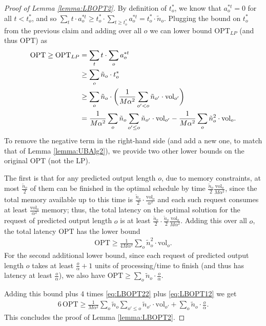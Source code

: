 \documentclass[11pt, a4paper]{article}
\theoremstyle{plain}
\theoremstyle{definition}
\theoremstyle{remark}
\newcommand{\OPT}{\text{OPT}}
\newcommand{\vol}{\textrm{vol}}
\begin{document}
\begin{proof}[Proof of Lemma \ref{lemma:LBOPT2}]
	By definition of $t^*_o$, we know that $a^{*t}_o = 0$ for all $t < t^*_o$, and so $\sum_t t \cdot a^{*t}_o \ge t^*_o \cdot \sum_{t \ge t^*_o} a^{*t}_o = t^*_o \cdot \tilde{n}_o$. Plugging the bound on $t^*_o$ from the previous claim and adding over all $o$ we can lower bound $\OPT_{LP}$ (and thus $\OPT$) as
	\begin{align}
	\OPT \ge \OPT_{LP} &= \sum_t t \cdot \sum_o a^{*t}_o \notag\\
	&\ge \sum_o \tilde{n}_o \cdot t^*_o \notag\\
	&\ge \sum_o \tilde{n}_o \cdot \bigg( \frac{1}{M\alpha^2} \sum_{o' < o} \tilde{n}_{o'} \cdot \vol_{o'} \bigg) \notag\\
	&=  \frac{1}{M\alpha^2} \sum_o \tilde{n}_o \sum_{o' \le o} \tilde{n}_{o'} \cdot \vol_{o'} - \frac{1}{M\alpha^2} \sum_o \tilde{n}_o^2 \cdot \vol_o.\label{eq:LBOPT12}
	\end{align}
	To remove the negative term in the right-hand side (and add a new one, to match that of Lemma \ref{lemma:UBAlg2}), we provide two other lower bounds on the original $\OPT$ (not the LP). 
	
	The first is that for any predicted output length $o$, due to memory constraints, at most $\frac{\tilde{n}_o}{2}$ of them can be finished in the optimal schedule by time $\frac{\tilde{n}_o}{2} \frac{\vol_o}{M\alpha^2}$, since the total memory available up to this time is $\frac{\tilde{n}_o}{2} \cdot \frac{\vol_o}{\alpha^2}$ and each such request consumes at least $\frac{\vol_o}{\alpha^2}$ memory; thus, the total latency on the optimal solution for the request of predicted output length $o$ is at least $\frac{\tilde{n}_o}{2} \cdot \frac{\tilde{n}_o}{2} \frac{\vol_o}{M\alpha^2}$. Adding this over all $o$, the total latency $\OPT$ has the lower bound 
	\begin{align}
	\OPT \ge \frac{1}{4M\alpha^2} \sum_o \tilde{n}^2_o \cdot \vol_o.  \label{eq:LBOPT22}
	\end{align}	
	For the second additional lower bound, since each request of predicted output length $o$ takes at least $\frac{o}{\alpha}+1$ units of processing/time to finish (and thus has latency at least $\frac{o}{\alpha}$), we also have $\OPT \ge \sum_o \tilde{n}_o \cdot \frac{o}{\alpha}$.%
	
	Adding this bound plus 4 times \eqref{eq:LBOPT22} plus \eqref{eq:LBOPT12} we get 
	\begin{align}
	6\, \OPT \ge  \frac{1}{M\alpha^2} \sum_o \tilde{n}_o \sum_{o' \le o} \tilde{n}_{o'} \cdot \vol_{o'} + \sum_o \tilde{n}_o \cdot \frac{o}{\alpha}.
	\end{align}	 
	This concludes the proof of Lemma \ref{lemma:LBOPT2}.
\end{proof}
\end{document}
